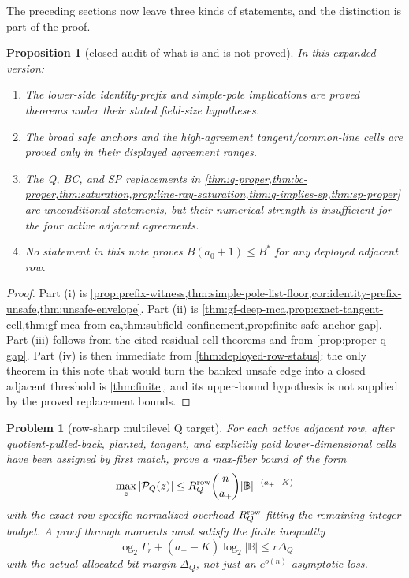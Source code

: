 \documentclass[a4paper,11pt]{amsart}
\newtheorem{proposition}[theorem]{Proposition}
\newtheorem{problem}[theorem]{Problem}
\theoremstyle{remark}
\newcommand{\B}{\mathbb B}
\begin{document}
The preceding sections now leave three kinds of statements, and the distinction is part of the proof.

\begin{proposition}[closed audit of what is and is not proved]\label{prop:closed-audit}
In this expanded version:
\begin{enumerate}[label=\textup{(\roman*)}]
\item The lower-side identity-prefix and simple-pole implications are proved theorems under their stated field-size hypotheses.
\item The broad safe anchors and the high-agreement tangent/common-line cells are proved only in their displayed agreement ranges.
\item The Q, BC, and SP replacements in \cref{thm:q-proper,thm:bc-proper,thm:saturation,prop:line-ray-saturation,thm:q-implies-sp,thm:sp-proper} are unconditional statements, but their numerical strength is insufficient for the four active adjacent agreements.
\item No statement in this note proves \(B(a_0+1)\le B^*\) for any deployed adjacent row.
\end{enumerate}
\end{proposition}

\begin{proof}
Part (i) is \cref{prop:prefix-witness,thm:simple-pole-list-floor,cor:identity-prefix-unsafe,thm:unsafe-envelope}.  Part (ii) is \cref{thm:gf-deep-mca,prop:exact-tangent-cell,thm:gf-mca-from-ca,thm:subfield-confinement,prop:finite-safe-anchor-gap}.  Part (iii) follows from the cited residual-cell theorems and from \cref{prop:proper-q-gap}.  Part (iv) is then immediate from \cref{thm:deployed-row-status}: the only theorem in this note that would turn the banked unsafe edge into a closed adjacent threshold is \cref{thm:finite}, and its upper-bound hypothesis is not supplied by the proved replacement bounds.
\end{proof}

\begin{problem}[row-sharp multilevel Q target]\label{prob:row-sharp-q}
For each active adjacent row, after quotient-pulled-back, planted, tangent, and explicitly paid lower-dimensional cells have been assigned by first match, prove a max-fiber bound of the form
\[
        \max_z |\mathcal P_Q(z)|
        \le
        R_Q^{\rm row}\binom n{a_+}|\B|^{-(a_+-K)}
\]
with the exact row-specific normalized overhead \(R_Q^{\rm row}\) fitting the remaining integer budget.  A proof through moments must satisfy the finite inequality
\[
        \log_2\Gamma_r+(a_+-K)\log_2|\B|\le r\Delta_Q
\]
with the actual allocated bit margin \(\Delta_Q\), not just an \(e^{o(n)}\) asymptotic loss.
\end{problem}
\end{document}
